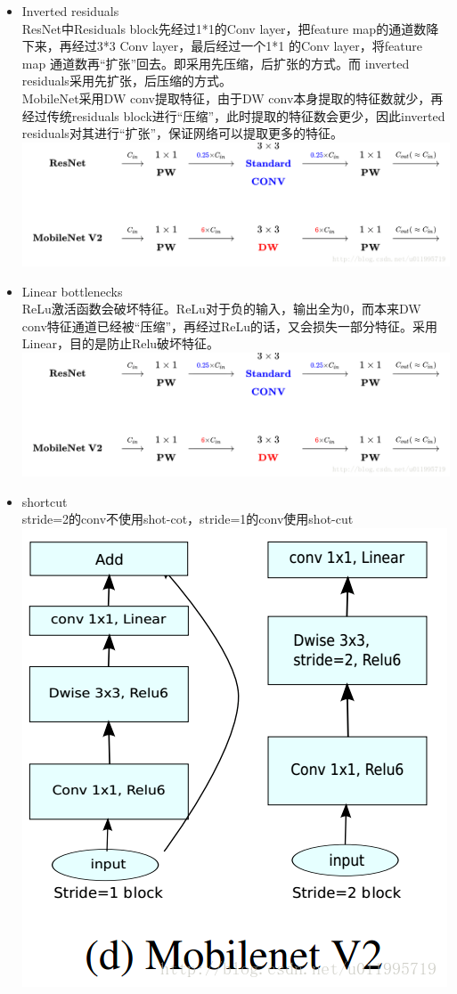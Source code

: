 \begin{itemize}
\item
  Inverted residuals\\
  ResNet中Residuals block先经过1*1的Conv layer，把feature
  map的通道数降下来，再经过3*3 Conv layer，最后经过一个1*1 的Conv
  layer，将feature map
  通道数再``扩张''回去。即采用先压缩，后扩张的方式。而 inverted
  residuals采用先扩张，后压缩的方式。\\
  MobileNet采用DW conv提取特征，由于DW
  conv本身提取的特征数就少，再经过传统residuals
  block进行``压缩''，此时提取的特征数会更少，因此inverted
  residuals对其进行``扩张''，保证网络可以提取更多的特征。
  \includegraphics{./img/ch17/17.png}
\item
  Linear bottlenecks\\
  ReLu激活函数会破坏特征。ReLu对于负的输入，输出全为0，而本来DW
  conv特征通道已经被``压缩''，再经过ReLu的话，又会损失一部分特征。采用Linear，目的是防止Relu破坏特征。
  \includegraphics{./img/ch17/18.png}
\item
  shortcut\\
  stride=2的conv不使用shot-cot，stride=1的conv使用shot-cut
  \includegraphics{./img/ch17/19.png}

\end{itemize}
